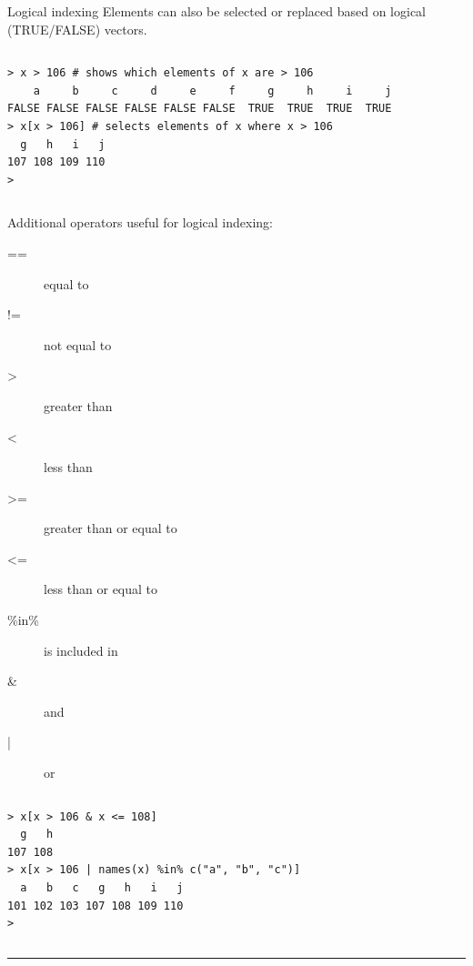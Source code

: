 \documentclass[table,smaller]{beamer}
\begin{document}
\begin{frame}[fragile,label=sec-3-2]{Logical indexing}
 Elements can also be selected or replaced based on logical (TRUE/FALSE) vectors.

\vspace{-.5em}
\begin{columns}
\begin{block}{}
\begin{verbatim}
> x > 106 # shows which elements of x are > 106
    a     b     c     d     e     f     g     h     i     j 
FALSE FALSE FALSE FALSE FALSE FALSE  TRUE  TRUE  TRUE  TRUE 
> x[x > 106] # selects elements of x where x > 106 
  g   h   i   j 
107 108 109 110 
>
\end{verbatim}
\end{block}
\end{columns}
\vspace{.5em}

Additional operators useful for logical indexing:
\begin{description}
\item[{==}] equal to
\item[{!=}] not equal to
\item[{>}] greater than
\item[{<}] less than
\item[{>=}] greater than or equal to
\item[{<=}] less than or equal to
\item[{\%in\%}] is included in
\item[{\&}] and
\item[{|}] or
\end{description}

\vspace{-.5em}
\begin{columns}
\begin{block}{}
\begin{verbatim}
> x[x > 106 & x <= 108]
  g   h 
107 108 
> x[x > 106 | names(x) %in% c("a", "b", "c")]
  a   b   c   g   h   i   j 
101 102 103 107 108 109 110 
>
\end{verbatim}
\end{block}
\end{columns}
\vspace{.5em}

\rule{\linewidth}{0.5pt}
\end{frame}
\end{document}
